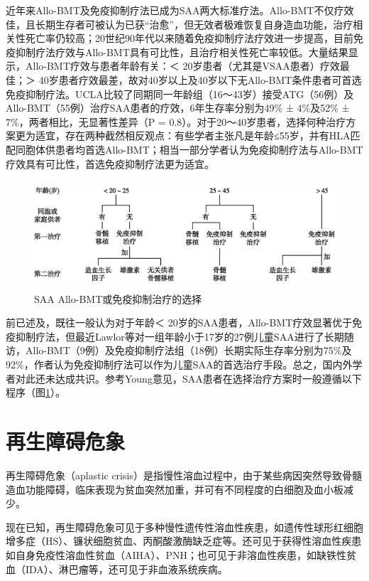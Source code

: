 近年来Allo-BMT及免疫抑制疗法已成为SAA两大标准疗法。Allo-BMT不仅疗效佳，且长期生存者可被认为已获“治愈”，但无效者极难恢复自身造血功能，治疗相关性死亡率仍较高；20世纪90年代以来随着免疫抑制疗法疗效进一步提高，目前免疫抑制疗法疗效与Allo-BMT具有可比性，且治疗相关性死亡率较低。大量结果显示，Allo-BMT疗效与患者年龄有关：＜
20岁患者（尤其是VSAA患者）疗效最佳；＞
40岁患者疗效最差，故对40岁以上及40岁以下无Allo-BMT条件患者可首选免疫抑制疗法。UCLA比较了同期同一年龄组（16～43岁）接受ATG（56例）及Allo-BMT（55例）治疗SAA患者的疗效，6年生存率分别为49\%
± 4\%及52\% ± 7\%，两者相比，无显著性差异（P =
0.8）。对于20～40岁患者，选择何种治疗方案更为适宜，存在两种截然相反观点：有些学者主张凡是年龄≤55岁，并有HLA匹配同胞体供患者均首选Allo-BMT；相当一部分学者认为免疫抑制疗法与Allo-BMT疗效具有可比性，首选免疫抑制疗法更为适宜。

\begin{figure}[!htbp]
 \centering
 \includegraphics[width=5.01042in,height=1.58333in]{./images/Image00129.jpg}
 \captionsetup{justification=centering}
 \caption{SAA Allo-BMT或免疫抑制治疗的选择}
 \label{fig34-1}
  \end{figure} 

前已述及，既往一般认为对于年龄＜
20岁的SAA患者，Allo-BMT疗效显著优于免疫抑制疗法，但最近Lawlor等对一组年龄小于17岁的27例儿童SAA进行了长期随访，Allo-BMT（9例）及免疫抑制疗法组（18例）长期实际生存率分别为75\%及92\%，作者认为免疫抑制疗法可以作为儿童SAA的首选治疗手段。总之，国内外学者对此还未达成共识。参考Young意见，SAA患者在选择治疗方案时一般遵循以下程序（图\ref{fig34-1}）。

\protect\hypertarget{text00090.html}{}{}

\section{再生障碍危象}

再生障碍危象（aplastic
crisis）是指慢性溶血过程中，由于某些病因突然导致骨髓造血功能障碍，临床表现为贫血突然加重，并可有不同程度的白细胞及血小板减少。

现在已知，再生障碍危象可见于多种慢性遗传性溶血性疾患，如遗传性球形红细胞增多症（HS）、镰状细胞贫血、丙酮酸激酶缺乏症等。还可见于获得性溶血性疾患如自身免疫性溶血性贫血（AIHA）、PNH；也可见于非溶血性疾患，如缺铁性贫血（IDA）、淋巴瘤等，还可见于非血液系统疾病。

